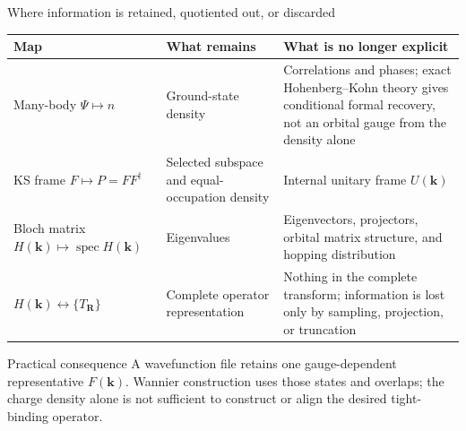 \documentclass[aspectratio=169,10pt]{beamer}
\begin{document}
\begin{frame}{Where information is retained, quotiented out, or discarded}
  \scriptsize
  \begin{tabular}{p{}p{}p{}}
    \toprule
    Map & What remains & What is no longer explicit\\
    \midrule
    Many-body $\Psi\mapsto n$
      & Ground-state density
      & Correlations and phases; exact Hohenberg--Kohn theory gives conditional formal
        recovery, not an orbital gauge from the density alone \cite{hohenberg1964}\\[0.5em]
    KS frame $F\mapsto P=FF^\dagger$
      & Selected subspace and equal-occupation density
      & Internal unitary frame $U(\mathbf k)$\\[0.5em]
    Bloch matrix $H(\mathbf k)\mapsto\operatorname{spec}H(\mathbf k)$
      & Eigenvalues
      & Eigenvectors, projectors, orbital matrix structure, and hopping distribution\\[0.5em]
    $H(\mathbf k)\leftrightarrow\{T_{\mathbf R}\}$
      & Complete operator representation
      & Nothing in the complete transform; information is lost only by sampling,
        projection, or truncation\\
    \bottomrule
  \end{tabular}

  \vspace{0.35em}
  \begin{block}{Practical consequence}
    A wavefunction file retains one gauge-dependent representative $F(\mathbf k)$.
    Wannier construction uses those states and overlaps; the charge density alone is not
    sufficient to construct or align the desired tight-binding operator.
  \end{block}
\end{frame}
\end{document}
